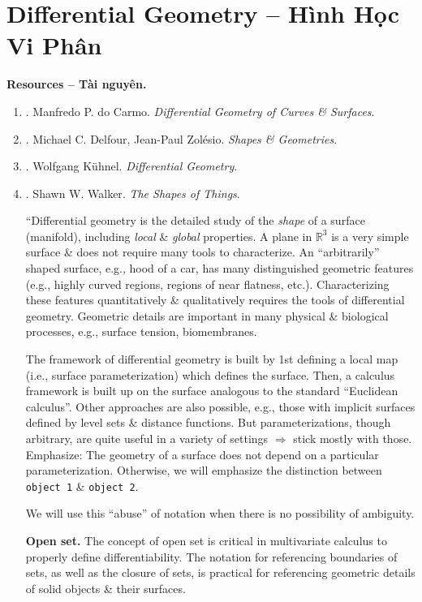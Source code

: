 \documentclass{article}
\begin{document}
\section{Differential Geometry -- Hình Học Vi Phân}
\textbf{\textsf{Resources -- Tài nguyên.}}
\begin{enumerate}
	\item \cite{Carmo2016}. {\sc Manfredo P. do Carmo}. {\it Differential Geometry of Curves \& Surfaces}.
	\item \cite{Delfour_Zolesio2001,Delfour_Zolesio2011}. {\sc Michael C. Delfour, Jean-Paul Zol\'{e}sio}. {\it Shapes \& Geometries}.
	\item \cite{Kuhnel2015}. {\sc Wolfgang K\"uhnel}. {\it Differential Geometry}.
	\item \cite{Walker2015}. {\sc Shawn W. Walker}. {\it The Shapes of Things}.
	
	``Differential geometry is the detailed study of the {\it shape} of a surface (manifold), including {\it local} \& {\it global} properties. A plane in $\mathbb{R}^3$ is a very simple surface \& does not require many tools to characterize. An ``arbitrarily'' shaped surface, e.g., hood of a car, has many distinguished geometric features (e.g., highly curved regions, regions of near flatness, etc.). Characterizing these features quantitatively \& qualitatively requires the tools of differential geometry. Geometric details are important in many physical \& biological processes, e.g., surface tension, biomembranes.
	
	The framework of differential geometry is built by 1st defining a local map (i.e., surface parameterization) which defines the surface. Then, a calculus framework is built up on the surface analogous to the standard ``Euclidean calculus''. Other approaches are also possible, e.g., those with implicit surfaces defined by level sets \& distance functions. But parameterizations, though arbitrary, are quite useful in a variety of settings $\Rightarrow$ stick mostly with those. Emphasize: The geometry of a surface does not depend on a particular parameterization. Otherwise, we will emphasize the distinction between {\tt object 1} \& {\tt object 2}.
	
	We will use this ``abuse'' of notation when there is no possibility of ambiguity.
	
	{\bf Open set.} The concept of open set is critical in multivariate calculus to properly define differentiability. The notation for referencing boundaries of sets, as well as the closure of sets, is practical for referencing geometric details of solid objects \& their surfaces.
	

\end{enumerate}
\end{document}

